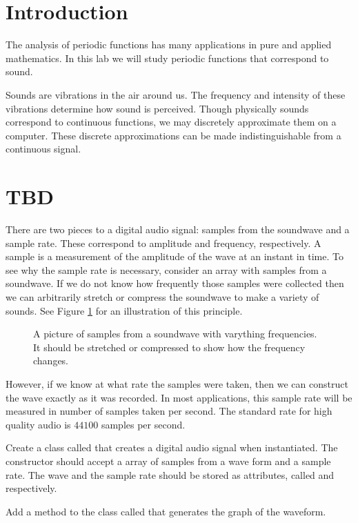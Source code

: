 
\section*{Introduction}

The analysis of periodic functions has many applications in pure and applied mathematics.
In this lab we will study periodic functions that correspond to sound.

Sounds are vibrations in the air around us.
The frequency and intensity of these vibrations determine how sound is perceived.
Though physically sounds correspond to continuous functions, we may discretely approximate them on a computer.
These discrete approximations can be made indistinguishable from a continuous signal.

\section*{TBD}

There are two pieces to a digital audio signal: samples from the soundwave and a sample rate.
These correspond to amplitude and frequency, respectively.
A sample is a measurement of the amplitude of the wave at an instant in time.
To see why the sample rate is necessary, consider an array with samples from a soundwave.
If we do not know how frequently those samples were collected then we can arbitrarily stretch or compress the soundwave to make a variety of sounds.
See Figure \ref{fig:comp_wave} for an illustration of this principle.

\begin{center}
\begin{figure}
\caption{A picture of samples from a soundwave with varything frequencies.  It should be stretched or compressed to show how the frequency changes.}
\label{fig:comp_wave}
\end{figure}
\end{center}

However, if we know at what rate the samples were taken, then we can construct the wave exactly as it was recorded.
In most applications, this sample rate will be measured in number of samples taken per second.
The standard rate for high quality audio is $44100$ samples per second.

\begin{problem}

Create a class called  that creates a digital audio signal when instantiated.
The constructor should accept a  array of samples from a wave form and a sample rate.
The wave and the sample rate should be stored as attributes, called  and  respectively.

Add a method to the class called  that generates the graph of the waveform.

\end{problem}

